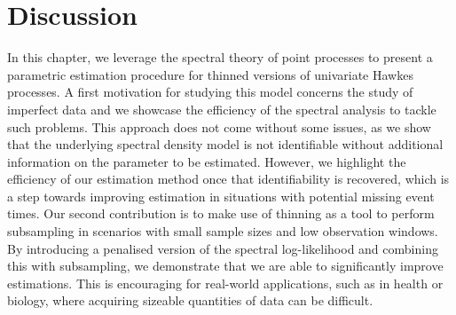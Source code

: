 

\section{Discussion}
    In this chapter, we leverage the spectral theory of point processes to present a parametric estimation procedure for thinned versions of univariate Hawkes processes.
    A first motivation for studying this model concerns the study of imperfect data and we showcase the efficiency of the spectral analysis to tackle such problems.
    This approach does not come without some issues, as we show that the underlying spectral density model is not identifiable without additional information on the parameter to be estimated.
    However, we highlight the efficiency of our estimation method once that identifiability is recovered, which is a step towards improving estimation in situations with potential missing event times.
    Our second contribution is to make use of thinning as a tool to perform subsampling in scenarios with small sample sizes and low observation windows. 
    By introducing a penalised version of the spectral log-likelihood and combining this with subsampling, we demonstrate that we are able to significantly improve estimations. 
    This is encouraging for real-world applications, such as in health or biology, where acquiring sizeable quantities of data can be difficult.

